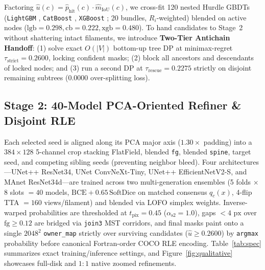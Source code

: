 \documentclass[sigconf]{acmart}
\begin{document}
Factoring $\hat{u}(c)=\hat{p}_{\text{hit}}(c)\cdot\hat{m}_{\text{IoU}}(c)$, we cross-fit 120 nested Hurdle GBDTs (\texttt{LightGBM} \cite{ke2017lightgbm}, \texttt{CatBoost} \cite{prokhorenkova2018catboost}, \texttt{XGBoost} \cite{chen2016xgboost}; 20 bundles, $R_i$-weighted) blended on active nodes ($\mathrm{lgb}=0.298, \mathrm{cb}=0.222, \mathrm{xgb}=0.480$). To hand candidates to Stage~2 without shattering intact filaments, we introduce \textbf{Two-Tier Antichain Handoff}: (1) solve exact $O(|V|)$ bottom-up tree DP at minimax-regret $\tau_{\text{strict}}=0.2600$, locking confident masks; (2) block all ancestors and descendants of locked nodes; and (3) run a second DP at $\tau_{\text{rescue}}=0.2275$ strictly on disjoint remaining subtrees ($0.0000$ over-splitting loss).

\subsection{Stage 2: 40-Model PCA-Oriented Refiner \& Disjoint RLE}
Each selected seed is aligned along its PCA major axis ($1.30\times$ padding) into a $384\times 128$ 5-channel crop stacking FlatField, blended \texttt{fg}, blended \texttt{spine}, target seed, and competing sibling seeds (preventing neighbor bleed). Four architectures---UNet++ ResNet34, UNet ConvNeXt-Tiny, UNet++ EfficientNetV2-S, and MAnet ResNet34d---are trained across two multi-generation ensembles (5 folds $\times$ 8 slots $=40$ models, $\mathrm{BCE}+0.65\,\mathrm{SoftDice}$ on matched consensus $q_c(x)$, 4-flip TTA $=160$ views/filament) and blended via LOFO simplex weights. Inverse-warped probabilities are thresholded at $t_{\text{pix}}=0.45$ ($\alpha_{\text{s2}}=1.0$), gaps $<4\text{ px}$ over $\mathrm{fg}\ge 0.12$ are bridged via \texttt{join3} MST corridors, and final masks paint onto a single $2048^2$ \texttt{owner\_map} strictly over surviving candidates ($\hat{u}\ge 0.2600$) by \texttt{argmax} probability before canonical Fortran-order COCO RLE encoding. Table~\ref{tab:spec} summarizes exact training/inference settings, and Figure~\ref{fig:qualitative} showcases full-disk and $1{:}1$ native zoomed refinements.
\end{document}
